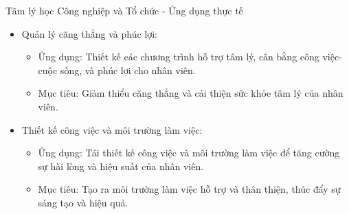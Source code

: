 \documentclass[../main.tex]{subfiles}
\begin{document}
\begin{frame}{Tâm lý học Công nghiệp và Tổ chức - Ứng dụng thực tế}
    \begin{itemize}  
        \item Quản lý căng thẳng và phúc lợi:
        \begin{itemize}
            \item Ứng dụng: Thiết kế các chương trình hỗ trợ tâm lý, cân bằng công việc-cuộc sống, và phúc lợi cho nhân viên.
            \item Mục tiêu: Giảm thiểu căng thẳng và cải thiện sức khỏe tâm lý của nhân viên.
        \end{itemize}
        
        \item Thiết kế công việc và môi trường làm việc:
        \begin{itemize}
            \item Ứng dụng: Tái thiết kế công việc và môi trường làm việc để tăng cường sự hài lòng và hiệu suất của nhân viên.
            \item Mục tiêu: Tạo ra môi trường làm việc hỗ trợ và thân thiện, thúc đẩy sự sáng tạo và hiệu quả.
        \end{itemize}
    \end{itemize}
\end{frame}
\end{document}
